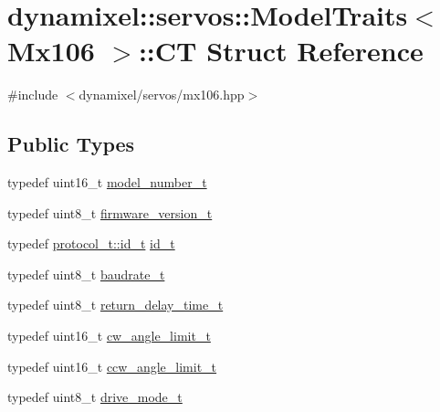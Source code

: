 \hypertarget{structdynamixel_1_1servos_1_1_model_traits_3_01_mx106_01_4_1_1_c_t}{}\section{dynamixel\+:\+:servos\+:\+:Model\+Traits$<$ Mx106 $>$\+:\+:CT Struct Reference}
\label{structdynamixel_1_1servos_1_1_model_traits_3_01_mx106_01_4_1_1_c_t}


{\ttfamily \#include $<$dynamixel/servos/mx106.\+hpp$>$}

\subsection*{Public Types}
\begin{DoxyCompactItemize}
\item 
typedef uint16\+\_\+t \hyperlink{structdynamixel_1_1servos_1_1_model_traits_3_01_mx106_01_4_1_1_c_t_aa4bb59a2fdf17f5ebdd048aeb01fa2c3}{model\+\_\+number\+\_\+t}
\item 
typedef uint8\+\_\+t \hyperlink{structdynamixel_1_1servos_1_1_model_traits_3_01_mx106_01_4_1_1_c_t_ab9ed3804f64159aa465d515efd6c5a40}{firmware\+\_\+version\+\_\+t}
\item 
typedef \hyperlink{classdynamixel_1_1protocols_1_1_protocol1_a1d4dfa22b01f80b1876d14f539d52b5c}{protocol\+\_\+t\+::id\+\_\+t} \hyperlink{structdynamixel_1_1servos_1_1_model_traits_3_01_mx106_01_4_1_1_c_t_ad709d5c549b4752da73ff5d82cf9463f}{id\+\_\+t}
\item 
typedef uint8\+\_\+t \hyperlink{structdynamixel_1_1servos_1_1_model_traits_3_01_mx106_01_4_1_1_c_t_a6f978feaf0e9f7a10d159f4d9c95dcf7}{baudrate\+\_\+t}
\item 
typedef uint8\+\_\+t \hyperlink{structdynamixel_1_1servos_1_1_model_traits_3_01_mx106_01_4_1_1_c_t_a009ebd138fd00814e30ea4122c866913}{return\+\_\+delay\+\_\+time\+\_\+t}
\item 
typedef uint16\+\_\+t \hyperlink{structdynamixel_1_1servos_1_1_model_traits_3_01_mx106_01_4_1_1_c_t_ad2b8e731c25af1b5b09f0e0488d353d6}{cw\+\_\+angle\+\_\+limit\+\_\+t}
\item 
typedef uint16\+\_\+t \hyperlink{structdynamixel_1_1servos_1_1_model_traits_3_01_mx106_01_4_1_1_c_t_ad40ab2381192772b0c5f43b3c0b7c4be}{ccw\+\_\+angle\+\_\+limit\+\_\+t}
\item 
typedef uint8\+\_\+t \hyperlink{structdynamixel_1_1servos_1_1_model_traits_3_01_mx106_01_4_1_1_c_t_a34fddef846226bbeacd5ad396f2b7602}{drive\+\_\+mode\+\_\+t}

\end{DoxyCompactItemize}
